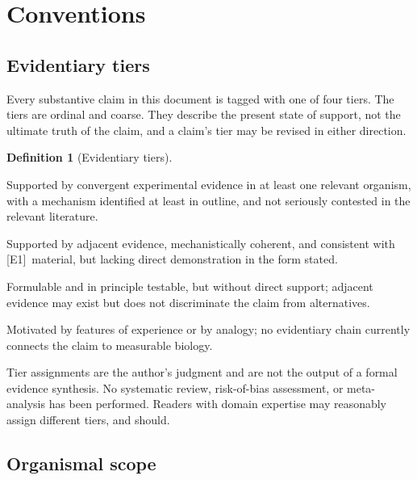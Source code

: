 \documentclass[11pt,a4paper]{article}
\theoremstyle{plain}
\theoremstyle{definition}
\newtheorem{definition}{Definition}[section]
\theoremstyle{remark}
\newcommand{\tier}[1]{\textup{\textsc{[#1]}}}
\newcommand{\Eone}{\tier{E1}}
\newcommand{\Etwo}{\tier{E2}}
\newcommand{\Ethree}{\tier{E3}}
\newcommand{\Efour}{\tier{E4}}
\begin{document}
\section{Conventions}\label{sec:conventions}

\subsection{Evidentiary tiers}

Every substantive claim in this document is tagged with one of four tiers. The tiers are ordinal and coarse. They describe the present state of support, not the ultimate truth of the claim, and a claim's tier may be revised in either direction.

\begin{definition}[Evidentiary tiers]
\leavevmode
\begin{description}[leftmargin=2.2em,itemsep=3pt]
\item[\Eone\ Established.] Supported by convergent experimental evidence in at least one relevant organism, with a mechanism identified at least in outline, and not seriously contested in the relevant literature.
\item[\Etwo\ Plausible.] Supported by adjacent evidence, mechanistically coherent, and consistent with \Eone\ material, but lacking direct demonstration in the form stated.
\item[\Ethree\ Open.] Formulable and in principle testable, but without direct support; adjacent evidence may exist but does not discriminate the claim from alternatives.
\item[\Efour\ Phenomenological.] Motivated by features of experience or by analogy; no evidentiary chain currently connects the claim to measurable biology.
\end{description}
\end{definition}

\begin{caution}
Tier assignments are the author's judgment and are not the output of a formal evidence synthesis. No systematic review, risk-of-bias assessment, or meta-analysis has been performed. Readers with domain expertise may reasonably assign different tiers, and should.
\end{caution}

\subsection{Organismal scope}
\end{document}
